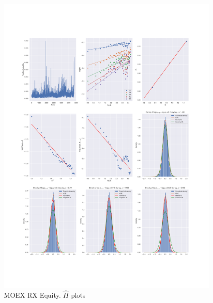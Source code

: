 \begin{figure}[h]
    \centering
    \includegraphics[width=\linewidth]{fig/MOEX RX Equity.pdf}
    \caption{MOEX RX Equity. $\hat{H}$ plots}
\end{figure} 
    
